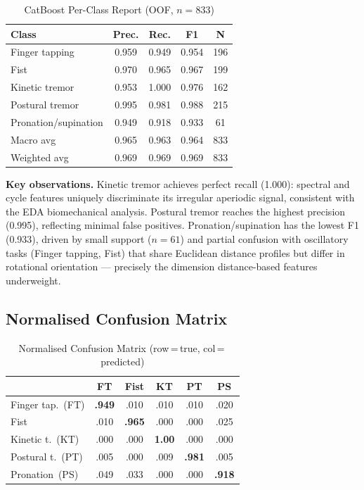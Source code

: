 \documentclass[11pt,twocolumn]{article}
\begin{document}
\begin{table}[H]
\centering
\caption{CatBoost Per-Class Report (OOF, $n=833$)}
\label{tab:per_class}
\small
\setlength{\tabcolsep}{3pt}
\begin{tabular}{lcccc}
\toprule
\textbf{Class} & \textbf{Prec.} & \textbf{Rec.} & \textbf{F1} & \textbf{N} \\
\midrule
Finger tapping       & 0.959 & 0.949 & 0.954 & 196 \\
Fist                 & 0.970 & 0.965 & 0.967 & 199 \\
Kinetic tremor       & 0.953 & 1.000 & 0.976 & 162 \\
Postural tremor      & 0.995 & 0.981 & 0.988 & 215 \\
Pronation/supination & 0.949 & 0.918 & 0.933 &  61 \\
\midrule
Macro avg            & 0.965 & 0.963 & 0.964 & 833 \\
Weighted avg         & 0.969 & 0.969 & 0.969 & 833 \\
\bottomrule
\end{tabular}
\end{table}
 
\textbf{Key observations.}
Kinetic tremor achieves perfect recall (1.000): spectral and cycle features uniquely discriminate its irregular aperiodic signal, consistent with the EDA biomechanical analysis.
Postural tremor reaches the highest precision (0.995), reflecting minimal false positives.
Pronation/supination has the lowest F1 (0.933), driven by small support ($n=61$) and partial confusion with oscillatory tasks (Finger tapping, Fist) that share Euclidean distance profiles but differ in rotational orientation --- precisely the dimension distance-based features underweight.
 
\subsection{Normalised Confusion Matrix}
 
\begin{table}[H]
\centering
\caption{Normalised Confusion Matrix (row\,=\,true, col\,=\,predicted)}
\label{tab:cm_detail}
\small
\setlength{\tabcolsep}{3pt}
\begin{tabular}{lccccc}
\toprule
 & \textbf{FT} & \textbf{Fist} & \textbf{KT} & \textbf{PT} & \textbf{PS} \\
\midrule
Finger tap.\ (FT) & \textbf{.949} & .010 & .010 & .010 & .020 \\
Fist              & .010 & \textbf{.965} & .000 & .000 & .025 \\
Kinetic t.\ (KT)  & .000 & .000 & \textbf{1.00} & .000 & .000 \\
Postural t.\ (PT) & .005 & .000 & .009 & \textbf{.981} & .005 \\
Pronation\ (PS)   & .049 & .033 & .000 & .000 & \textbf{.918} \\
\bottomrule
\end{tabular}
\end{table}
 
\end{document}
